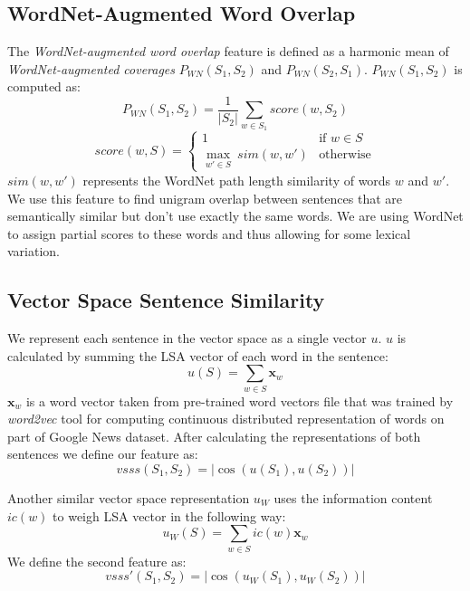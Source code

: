 \documentclass[10pt, a4paper]{article}
\begin{document}
\subsection{WordNet-Augmented Word Overlap}
The \textit{WordNet-augmented word overlap} feature is defined as a harmonic mean of \textit{WordNet-augmented coverages} $P_{WN}(S_1, S_2)$ and $P_{WN}(S_2, S_1)$. $P_{WN}(S_1, S_2)$ is computed as:
\begin{equation}
P_{WN}(S_1, S_2) = \dfrac{1}{|S_2|}\sum_{w \in S_1}score(w, S_2)
\end{equation}
\begin{equation}
score(w, S) = \left\{
\begin{array}{ll}
1 & \mbox{if } w \in S \\
\underset{w' \in S}{\max} \: sim(w, w') & \mbox{otherwise}
\end{array}
\right.
\end{equation}
$sim(w, w')$ represents the WordNet path length similarity of words $w$ and $w'$. We use this feature to find unigram overlap between sentences that are semantically similar but don't use exactly the same words. We are using WordNet to assign partial scores to these words and thus allowing for some lexical variation.

\subsection{Vector Space Sentence Similarity}
We represent each sentence in the vector space as a single vector $u$. $u$ is calculated by summing the LSA vector of each word in the sentence:
\begin{equation}
u(S) = \sum_{w \in S} \textbf{x}_w
\end{equation}
$\textbf{x}_w$ is a word vector taken from pre-trained word vectors file that was trained by \textit{word2vec} tool for computing continuous distributed representation of words on part of Google News dataset. After calculating the representations of both sentences we define our feature as:
\begin{equation}
vsss(S_1, S_2) = |\cos(u(S_1), u(S_2))|
\end{equation}

Another similar vector space representation $u_W$ uses the information content $ic(w)$ to weigh LSA vector in the following way:
\begin{equation}
u_W(S) = \sum_{w \in S} ic(w)\textbf{x}_w
\end{equation}
We define the second feature as:
\begin{equation}
vsss'(S_1, S_2) = |\cos(u_W(S_1), u_W(S_2))|
\end{equation}
\end{document}
